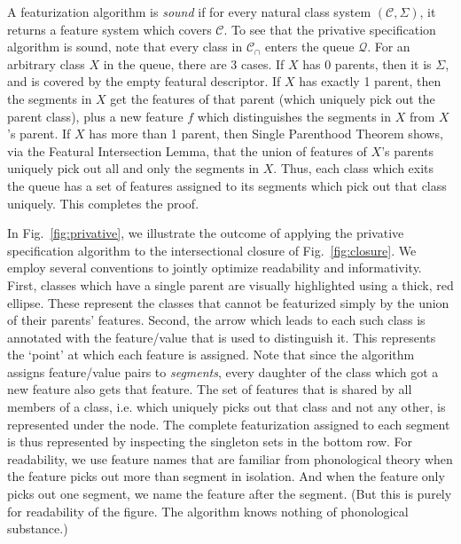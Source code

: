 \documentclass[11pt, oneside]{article}   	%
\begin{document}
A featurization algorithm is \textit{sound} if for every natural class system $(\mathcal C, \Sigma)$, it returns a feature system which covers $\mathcal C$. To see that the privative specification algorithm is sound, note that every class in $\mathcal C_\cap$ enters the queue $\mathcal Q$. For an arbitrary class $X$ in the queue, there are 3 cases. If $X$ has 0 parents, then it is $\Sigma$, and is covered by the empty featural descriptor. If $X$ has exactly 1 parent, then the segments in $X$ get the features of that parent (which uniquely pick out the parent class), plus a new feature $f$ which distinguishes the segments in $X$ from $X$'s parent. If $X$ has more than 1 parent, then Single Parenthood Theorem shows, via the Featural Intersection Lemma, that the union of features of $X$'s parents uniquely pick out all and only the segments in $X$. Thus, each class which exits the queue has a set of features assigned to its segments which pick out that class uniquely. This completes the proof.

\vspace{\baselineskip} In Fig.~\ref{fig:privative}, we illustrate the outcome of applying the privative specification algorithm to the intersectional closure of Fig.~\ref{fig:closure}. We employ several conventions to jointly optimize readability and informativity. First, classes which have a single parent are visually highlighted using a thick, red ellipse. These represent the classes that cannot be featurized simply by the union of their parents' features. Second, the arrow which leads to each such class is annotated with the feature/value that is used to distinguish it. This represents the `point' at which each feature is assigned. Note that since the algorithm assigns feature/value pairs to \textit{segments}, every daughter of the class which got a new feature also gets that feature. The set of features that is shared by all members of a class, i.e. which uniquely picks out that class and not any other, is represented under the node. The complete featurization assigned to each segment is thus represented by inspecting the singleton sets in the bottom row. For readability, we use feature names that are familiar from phonological theory when the feature picks out more than segment in isolation. And when the feature only picks out one segment, we name the feature after the segment. (But this is purely for readability of the figure. The algorithm knows nothing of phonological substance.)
\end{document}
